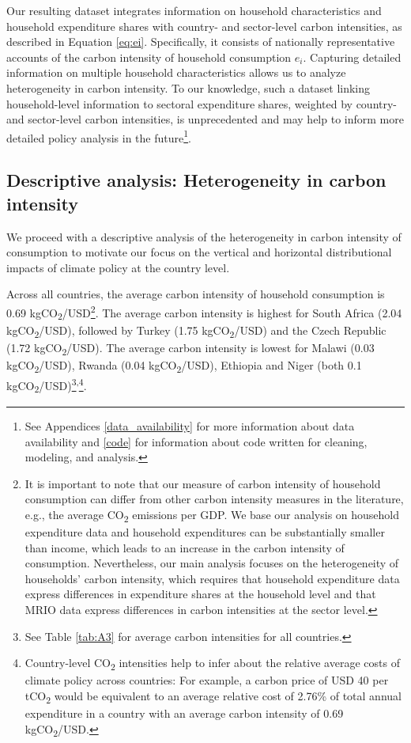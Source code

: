 \documentclass[12pt, a4paper]{article}
\begin{document}
Our resulting dataset integrates information on household characteristics and household expenditure shares with country- and sector-level carbon intensities, as described in Equation \ref{eq:ei}. Specifically, it consists of nationally representative accounts of the carbon intensity of household consumption $e_{i}$. Capturing detailed information on multiple household characteristics allows us to analyze heterogeneity in carbon intensity. To our knowledge, such a dataset linking household-level information to sectoral expenditure shares, weighted by country- and sector-level carbon intensities, is unprecedented and may help to inform more detailed policy analysis in the future\footnote{See Appendices \ref{data_availability} for more information about data availability and \ref{code} for information about code written for cleaning, modeling, and analysis.}.

\subsection{Descriptive analysis: Heterogeneity in carbon intensity} \label{sec:descriptive}

We proceed with a descriptive analysis of the heterogeneity in carbon intensity of consumption to motivate our focus on the vertical and horizontal distributional impacts of climate policy at the country level.

Across all countries, the average carbon intensity of household consumption is 0.69 kgCO\textsubscript{2}/USD\footnote{It is important to note that our measure of carbon intensity of household consumption can differ from other carbon intensity measures in the literature, e.g., the average CO\textsubscript{2} emissions per GDP.  We base our analysis on household expenditure data and household expenditures can be substantially smaller than income, which leads to an increase in the carbon intensity of consumption. Nevertheless, our main analysis focuses on the heterogeneity of households' carbon intensity, which requires that household expenditure data express differences in expenditure shares at the household level and that MRIO data express differences in carbon intensities at the sector level.}. The average carbon intensity is highest for South Africa (2.04 kgCO\textsubscript{2}/USD), followed by Turkey (1.75 kgCO\textsubscript{2}/USD) and the Czech Republic (1.72 kgCO\textsubscript{2}/USD). The average carbon intensity is lowest for Malawi (0.03 kgCO\textsubscript{2}/USD), Rwanda (0.04 kgCO\textsubscript{2}/USD), Ethiopia and Niger (both 0.1 kgCO\textsubscript{2}/USD)\footnote{See Table \ref{tab:A3} for average carbon intensities for all countries.}\textsuperscript{,}\footnote{Country-level CO\textsubscript{2} intensities help to infer about the relative average costs of climate policy across countries: For example, a carbon price of USD 40 per tCO\textsubscript{2} \autocite{Stiglitz.2017} would be equivalent to an average relative cost of 2.76\% of total annual expenditure in a country with an average carbon intensity of 0.69 kgCO\textsubscript{2}/USD.}.
\end{document}
